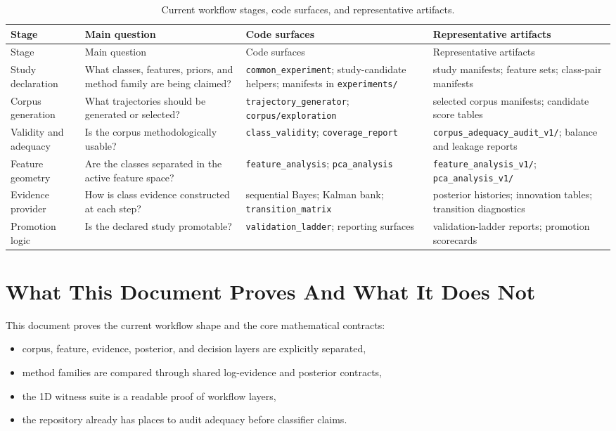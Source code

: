 \documentclass[11pt]{article}
\begin{document}
\small
\begin{longtable}{@{}p{} p{} p{} p{}@{}}
\caption{Current workflow stages, code surfaces, and representative artifacts.}
\label{tab:workflow_map} \\
\toprule
Stage & Main question & Code surfaces & Representative artifacts \\
\midrule
\endfirsthead
\toprule
Stage & Main question & Code surfaces & Representative artifacts \\
\midrule
\endhead
Study declaration & What classes, features, priors, and method family are being claimed? & \texttt{common\_experiment}; study-candidate helpers; manifests in \texttt{experiments/} & study manifests; feature sets; class-pair manifests \\
Corpus generation & What trajectories should be generated or selected? & \texttt{trajectory\_generator}; \texttt{corpus/exploration} & selected corpus manifests; candidate score tables \\
Validity and adequacy & Is the corpus methodologically usable? & \texttt{class\_validity}; \texttt{coverage\_report} & \texttt{corpus\_adequacy\_audit\_v1/}; balance and leakage reports \\
Feature geometry & Are the classes separated in the active feature space? & \texttt{feature\_analysis}; \texttt{pca\_analysis} & \texttt{feature\_analysis\_v1/}; \texttt{pca\_analysis\_v1/} \\
Evidence provider & How is class evidence constructed at each step? & sequential Bayes; Kalman bank; \texttt{transition\_matrix} & posterior histories; innovation tables; transition diagnostics \\
Promotion logic & Is the declared study promotable? & \texttt{validation\_ladder}; reporting surfaces & validation-ladder reports; promotion scorecards \\
\bottomrule
\end{longtable}
\normalsize

\section{What This Document Proves And What It Does Not}
This document proves the current workflow shape and the core mathematical contracts:
\begin{itemize}[leftmargin=1.5em]
  \item corpus, feature, evidence, posterior, and decision layers are explicitly separated,
  \item method families are compared through shared log-evidence and posterior contracts,
  \item the 1D witness suite is a readable proof of workflow layers,
  \item the repository already has places to audit adequacy before classifier claims.
\end{itemize}
\end{document}
